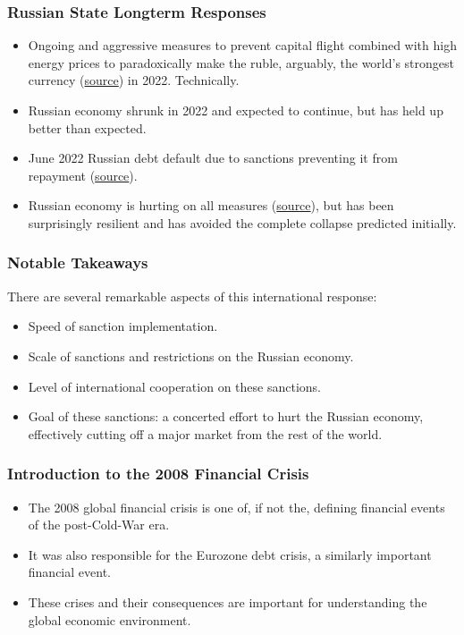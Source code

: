 \documentclass{beamer}
\begin{document}
\begin{frame} 
	\frametitle{\LARGE{Russian State Longterm Responses}}
	\begin{itemize}
		\item Ongoing and aggressive measures to prevent capital flight combined with high energy prices to paradoxically make the ruble, arguably, the world's strongest currency (\href{https://www.cbsnews.com/news/russia-ukraine-ruble-currency-russian-economy-sanctioms-2022/}{source}) in 2022. Technically. \pause
		\item Russian economy shrunk in 2022 and expected to continue, but has held up better than expected. \pause
		\item June 2022 Russian debt default due to sanctions preventing it from repayment (\href{https://www.cbsnews.com/news/russia-default-on-debt/}{source}). \pause
		\item Russian economy is hurting on all measures (\href{https://www.bbc.com/news/world-europe-60125659}{source}), but has been surprisingly resilient and has avoided the complete collapse predicted initially.
	\end{itemize}
	
\end{frame}

\begin{frame} 
	\frametitle{\LARGE{Notable Takeaways}}
	There are several remarkable aspects of this international response:
	\begin{itemize}
		\item Speed of sanction implementation. \pause
		\item Scale of sanctions and restrictions on the Russian economy. \pause
		\item Level of international cooperation on these sanctions. \pause
		\item Goal of these sanctions: a concerted effort to hurt the Russian economy, effectively cutting off a major market from the rest of the world.	
	\end{itemize}
\end{frame}

\begin{frame} 
	\frametitle{\LARGE{Introduction to the 2008 Financial Crisis}}
	\begin{itemize}
		\item The 2008 global financial crisis is one of, if not the, defining financial events of the post-Cold-War era. \pause
		\item It was also responsible for the Eurozone debt crisis, a similarly important financial event. \pause
		\item These crises and their consequences are important for understanding the global economic environment. 
	\end{itemize}
\end{frame}
\end{document}
